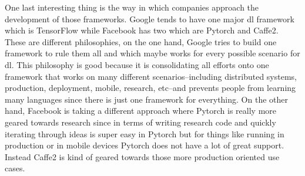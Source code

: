 \documentclass[11pt,a4paper]{article}
\begin{document}
One last interesting thing is the way in which companies approach the development of those frameworks. Google tends to have one major \gls{dl} framework which is TensorFlow while Facebook has two which are Pytorch and Caffe2. These are different philosophies, on the one hand, Google tries to build one framework to rule them all and which maybe works for every possible scenario for \gls{dl}. This philosophy is good because it is consolidating all efforts onto one framework that works on many different scenarios--including distributed systems, production, deployment, mobile, research, etc--and prevents people from learning many languages since there is just one framework for everything. On the other hand, Facebook is taking a different approach where Pytorch is really more geared towards research since in terms of writing research code and quickly iterating through ideas is super easy in Pytorch but for things like running in production or in mobile devices Pytorch does not have a lot of great support. Instead Caffe2 is kind of geared towards those more production oriented use cases. 





































\end{document}
